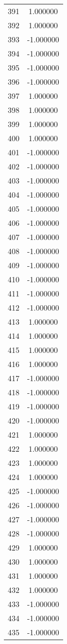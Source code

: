 \documentclass[12pt]{article}
\begin{document}
\begin{longtable}{@{}cc@{}}
391 & 1.000000 \\
392 & 1.000000 \\
393 & -1.000000 \\
394 & -1.000000 \\
395 & -1.000000 \\
396 & -1.000000 \\
397 & 1.000000 \\
398 & 1.000000 \\
399 & 1.000000 \\
400 & 1.000000 \\
401 & -1.000000 \\
402 & -1.000000 \\
403 & -1.000000 \\
404 & -1.000000 \\
405 & -1.000000 \\
406 & -1.000000 \\
407 & -1.000000 \\
408 & -1.000000 \\
409 & -1.000000 \\
410 & -1.000000 \\
411 & -1.000000 \\
412 & -1.000000 \\
413 & 1.000000 \\
414 & 1.000000 \\
415 & 1.000000 \\
416 & 1.000000 \\
417 & -1.000000 \\
418 & -1.000000 \\
419 & -1.000000 \\
420 & -1.000000 \\
421 & 1.000000 \\
422 & 1.000000 \\
423 & 1.000000 \\
424 & 1.000000 \\
425 & -1.000000 \\
426 & -1.000000 \\
427 & -1.000000 \\
428 & -1.000000 \\
429 & 1.000000 \\
430 & 1.000000 \\
431 & 1.000000 \\
432 & 1.000000 \\
433 & -1.000000 \\
434 & -1.000000 \\
435 & -1.000000 \\

\end{longtable}
\end{document}

